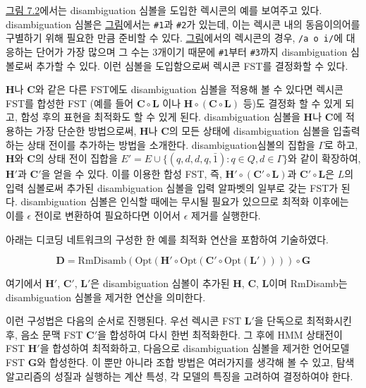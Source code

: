 \documentclass[../main.tex]{subfiles}
\begin{document}
\hyperref[fig:7_2]{그림 7.2}에서는 disambiguation 심볼을 도입한 렉시콘의 예를 보여주고 있다. 
disambiguation 심볼은 \hyperref[fig:7_2]{그림}에서는 \texttt{\#1}과 \texttt{\#2}가 있는데, 이는 렉시콘 내의 동음이의어를 구별하기 위해 필요한 만큼 준비할 수 있다. 
\hyperref[fig:7_2]{그림}에서의 렉시콘의 경우, \texttt{/a o i/}에 대응하는 단어가 가장 많으며 그 수는 3개이기 때문에 \texttt{\#1}부터 \texttt{\#3}까지 disambiguation 심볼로써 추가할 수 있다. 
이런 심볼을 도입함으로써 렉시콘 FST를 결정화할 수 있다. 

$\bm{H}$나 $\bm{C}$와 같은 다른 FST에도 disambiguation 심볼을 적용해 볼 수 있다면 렉시콘 FST를 합성한 FST (예를 들어 $\bm{C} \circ \bm{L}$ 이나 $\bm{H} \circ (\bm{C} \circ \bm{L})$ 등)도 결정화 할 수 있게 되고, 합성 후의 표현을 최적화도 할 수 있게 된다. 
disambiguation 심볼을 $\bm{H}$나 $\bm{C}$에 적용하는 가장 단순한 방법으로써, $\bm{H}$나 $\bm{C}$의 모든 상태에 disambiguation 심볼을 입출력하는 상태 전이를 추가하는 방법을 소개한다. 
disambiguation심볼의 집합을 $\Gamma$로 하고, $\bm{H}$와 $\bm{C}$의 상태 전이 집합을 $E' = E \cup \{ (q, d, d, q, \bar{1}) : q \in Q, d \in \Gamma \}$와 같이 확장하여, $\bm{H'}$과 $\bm{C'}$을 얻을 수 있다. 
이를 이용한 합성 FST, 즉, $\bm{H'} \circ (\bm{C'} \circ \bm{L})$과 $\bm{C'} \circ \bm{L}$은 $L$의 입력 심볼로써 추가된 disambiguation 심볼을 입력 알파벳의 일부로 갖는 FST가 된다. 
disambiguation 심볼은 인식할 때에는 무시될 필요가 있으므로 최적화 이후에는 이를 $\epsilon$ 전이로 변환하여 필요하다면 이어서 $\epsilon$ 제거를 실행한다.

아래는 디코딩 네트워크의 구성한 한 예를 최적화 연산을 포함하여 기술하였다. 

\begin{equation}\label{eq:7_4}
    \bm{D} = \text{RmDisamb} (\text{Opt} (\bm{H'} \circ \text{Opt} ( \bm{C'} \circ \text{Opt} (\bm{L'}) ) ) ) \circ \bm{G}
\end{equation}

여기에서 $\bm{H'}$, $\bm{C'}$, $\bm{L'}$은 disambiguation 심볼이 추가된 $\bm{H}$, $\bm{C}$, $\bm{L}$이며 RmDisamb는 disambiguation 심볼을 제거한 연산을 의미한다. 

이런 구성법은 다음의 순서로 진행된다. 
우선 렉시콘 FST $\bm{L'}$을 단독으로 최적화시킨 후, 음소 문맥 FST $\bm{C'}$을 합성하여 다시 한번 최적화한다. 
그 후에 HMM 상태전이 FST $\bm{H'}$을 합성하여 최적화하고, 다음으로 disambiguation 심볼을 제거한 언어모델 FST $\bm{G}$와 합성한다. 
이 뿐만 아니라 조합 방법은 여러가지를 생각해 볼 수 있고, 탐색 알고리즘의 성질과 실행하는 계산 특성, 각 모델의 특징을 고려하여 결정하여야 한다. 
\end{document}
